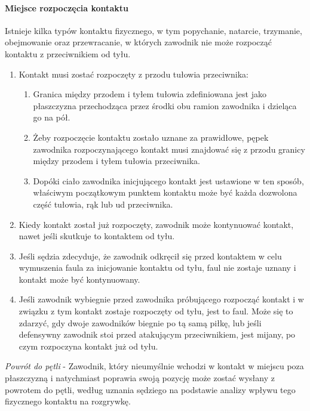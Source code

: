 \documentclass[12pt]{article}
\begin{document}
\paragraph{Miejsce rozpoczęcia kontaktu}
Istnieje kilka typów
kontaktu fizycznego, w tym popychanie, natarcie, trzymanie, obejmowanie
oraz przewracanie, w których zawodnik nie może rozpocząć kontaktu z
przeciwnikiem od tyłu.

\begin{enumerate}
	\item
	      Kontakt musi zostać rozpoczęty z przodu tułowia przeciwnika:

	      \begin{enumerate}
		      \item
		            Granica między przodem i tyłem tułowia zdefiniowana jest jako
		            płaszczyzna przechodząca przez środki obu ramion zawodnika i
		            dzieląca go na pół.
		      \item
		            Żeby rozpoczęcie kontaktu zostało uznane za prawidłowe, pępek
		            zawodnika rozpoczynającego kontakt musi znajdować się z przodu
		            granicy między przodem i tyłem tułowia przeciwnika.
		      \item
		            Dopóki ciało zawodnika inicjującego kontakt jest ustawione w ten
		            sposób, właściwym początkowym punktem kontaktu może być każda
		            dozwolona część tułowia, rąk lub ud przeciwnika.
	      \end{enumerate}
	\item
	      Kiedy kontakt został już rozpoczęty, zawodnik może kontynuować
	      kontakt, nawet jeśli skutkuje to kontaktem od tyłu.
	\item
	      Jeśli sędzia zdecyduje, że zawodnik odkręcił się przed kontaktem w
	      celu wymuszenia faula za inicjowanie kontaktu od tyłu, faul nie
	      zostaje uznany i kontakt może być kontynuowany.
	\item
	      Jeśli zawodnik wybiegnie przed zawodnika próbującego rozpocząć kontakt
	      i w związku z tym kontakt zostaje rozpoczęty od tyłu, jest to faul.
	      Może się to zdarzyć, gdy dwoje zawodników biegnie po tą samą piłkę,
	      lub jeśli defensywny zawodnik stoi przed atakującym przeciwnikiem,
	      jest mijany, po czym rozpoczyna kontakt już od tyłu.
\end{enumerate}

\emph{Powrót do pętli} - Zawodnik, który nieumyślnie wchodzi w kontakt w
miejscu poza płaszczyzną i natychmiast poprawia swoją pozycję może
zostać wysłany z powrotem do pętli, według uznania sędziego na podstawie
analizy wpływu tego fizycznego kontaktu na rozgrywkę.
\end{document}

